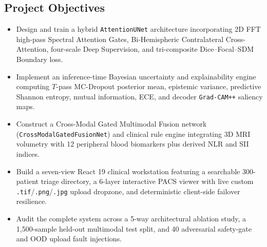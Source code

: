 \documentclass[conference]{IEEEtran}
\begin{document}
\subsection{Project Objectives}
\begin{itemize}
    \item Design and train a hybrid \texttt{AttentionUNet} architecture incorporating 2D FFT high-pass Spectral Attention Gates, Bi-Hemispheric Contralateral Cross-Attention, four-scale Deep Supervision, and tri-composite Dice--Focal--SDM Boundary loss.
    \item Implement an inference-time Bayesian uncertainty and explainability engine computing $T$-pass MC-Dropout posterior mean, epistemic variance, predictive Shannon entropy, mutual information, ECE, and decoder \texttt{Grad-CAM++} saliency maps.
    \item Construct a Cross-Modal Gated Multimodal Fusion network (\texttt{CrossModalGatedFusionNet}) and clinical rule engine integrating 3D MRI volumetry with 12 peripheral blood biomarkers plus derived NLR and SII indices.
    \item Build a seven-view React 19 clinical workstation featuring a searchable 300-patient triage directory, a 6-layer interactive PACS viewer with live custom \texttt{.tif}/\texttt{.png}/\texttt{.jpg} upload dropzone, and deterministic client-side failover resilience.
    \item Audit the complete system across a 5-way architectural ablation study, a 1,500-sample held-out multimodal test split, and 40 adversarial safety-gate and OOD upload fault injections.
\end{itemize}
\end{document}

